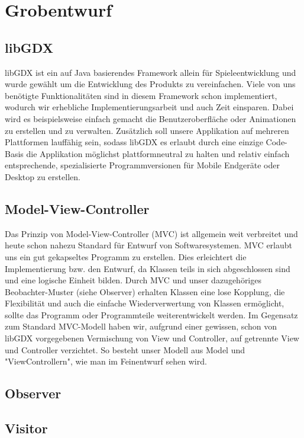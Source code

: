 \section{Grobentwurf}

\subsection{libGDX}
libGDX ist ein auf Java basierendes Framework allein für Spieleentwicklung und wurde gewählt um die Entwicklung des Produkts zu vereinfachen.
Viele von uns benötigte Funktionalitäten sind in diesem Framework schon implementiert, wodurch wir erhebliche Implementierungsarbeit und auch Zeit einsparen.
Dabei wird es beispielsweise einfach gemacht die Benutzeroberfläche oder Animationen zu erstellen und zu verwalten.
Zusätzlich soll unsere Applikation auf mehreren Plattformen lauffähig sein, sodass libGDX es erlaubt durch eine einzige Code-Basis die Applikation möglichst plattformneutral zu halten 
und relativ einfach entsprechende, spezialisierte Programmversionen für Mobile Endgeräte oder Desktop zu erstellen.

\subsection{Model-View-Controller}
Das Prinzip von Model-View-Controller (MVC) ist allgemein weit verbreitet und heute schon nahezu Standard für Entwurf von Softwaresystemen. 
MVC erlaubt uns ein gut gekapseltes Programm zu erstellen. Dies erleichtert die Implementierung bzw. den Entwurf, da Klassen teils in sich abgeschlossen sind
und eine logische Einheit bilden. Durch MVC und unser dazugehöriges Beobachter-Muster (siehe Observer) erhalten Klassen eine lose Kopplung,
die Flexibilität und auch die einfache Wiederverwertung von Klassen ermöglicht, sollte das Programm oder Programmteile weiterentwickelt werden.
Im Gegensatz zum Standard MVC-Modell haben wir, aufgrund einer gewissen, schon von libGDX vorgegebenen Vermischung von View und Controller,
auf getrennte View und Controller verzichtet. So besteht unser Modell aus Model und "ViewControllern", wie man im Feinentwurf sehen wird.

\subsection{Observer}

\subsection{Visitor}


